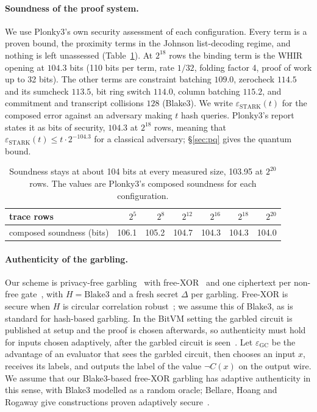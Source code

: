 \documentclass[11pt]{article}
\newcommand{\blake}{\mathrm{Blake3}}
\begin{document}
\paragraph{Soundness of the proof system.} We use Plonky3's own security
assessment of each configuration. Every term is a proven bound, the proximity
terms in the Johnson list-decoding regime, and nothing is left unassessed
(Table~\ref{tab:security}).
At $2^{18}$ rows the binding term is the WHIR opening at $104.3$ bits (110 bits per
term, rate $1/32$, folding factor 4, proof of work up to 32 bits). The other terms
are constraint batching $109.0$, zerocheck $114.5$ and its sumcheck $113.5$, bit
ring switch $114.0$, column batching $115.2$, and commitment and transcript
collisions $128$ (Blake3). We write $\varepsilon_{\mathrm{STARK}}(t)$ for the
composed error against an adversary making $t$ hash queries. Plonky3's report
states it as bits of security, $104.3$ at $2^{18}$ rows, meaning that
$\varepsilon_{\mathrm{STARK}}(t)\le t\cdot2^{-104.3}$ for a classical adversary; \S\ref{sec:pq} gives the quantum bound.

\begin{table}[t]\centering\small
\begin{tabular}{lrrrrrr}\toprule
trace rows & $2^5$ & $2^8$ & $2^{12}$ & $2^{16}$ & $2^{18}$ & $2^{20}$\\\midrule
composed soundness (bits) & 106.1 & 105.2 & 104.7 & 104.3 & 104.3 & 104.0\\\bottomrule
\end{tabular}
\caption{Soundness stays at about 104 bits at every measured size, 103.95 at $2^{20}$ rows. The values are
Plonky3's composed soundness for each configuration.}
\label{tab:security}
\end{table}

\paragraph{Authenticity of the garbling.} Our scheme is privacy-free
garbling~\cite{fno15privacyfree} with free-XOR~\cite{ks08} and one ciphertext per
non-free gate~\cite{zre15}, with $H=\blake$ and a fresh secret $\Delta$ per
garbling. Free-XOR is secure when $H$ is circular correlation
robust~\cite{ckkz12freexor}; we assume this of Blake3, as is standard for
hash-based garbling. In the BitVM setting the garbled circuit is published at
setup and the proof is chosen afterwards, so authenticity must hold for inputs
chosen adaptively, after the garbled circuit is seen~\cite{bhr12adaptive}. Let
$\varepsilon_{\mathrm{GC}}$ be the advantage of an evaluator that sees the garbled
circuit, then chooses an input $x$, receives its labels, and outputs the label of
the value $\neg C(x)$ on the output wire. We assume that our Blake3-based
free-XOR garbling has adaptive authenticity in this sense, with Blake3 modelled as
a random oracle; Bellare, Hoang and Rogaway give constructions proven adaptively
secure~\cite{bhr12adaptive}.
\end{document}
